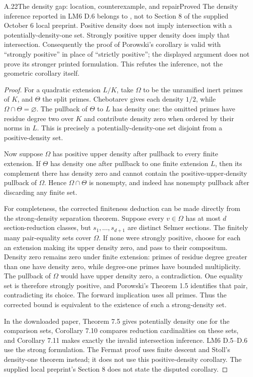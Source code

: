 \begin{statement}{A.22}{The density gap: location, counterexample, and repair}{Proved}
The density inference reported in LM6 D.6 belongs to \citet[Corollary 7.11]{Porowski2026}, not to Section 8 of the supplied October 6 local preprint. Positive density does not imply intersection with a potentially-density-one set. Strongly positive upper density does imply that intersection. Consequently the proof of Porowski's corollary is valid with ``strongly positive'' in place of ``strictly positive''; the displayed argument does not prove its stronger printed formulation. This refutes the inference, not the geometric corollary itself.
\end{statement}
\begin{proof}
For a quadratic extension $L/K$, take $\Omega$ to be the unramified inert primes of $K$, and $\Theta$ the split primes. Chebotarev gives each density $1/2$, while $\Omega\cap\Theta=\varnothing$. The pullback of $\Theta$ to $L$ has density one: the omitted primes have residue degree two over $K$ and contribute density zero when ordered by their norms in $L$. This is precisely a potentially-density-one set disjoint from a positive-density set.

Now suppose $\Omega$ has positive upper density after pullback to every finite extension. If $\Theta$ has density one after pullback to one finite extension $L$, then its complement there has density zero and cannot contain the positive-upper-density pullback of $\Omega$. Hence $\Omega\cap\Theta$ is nonempty, and indeed has nonempty pullback after discarding any finite set.

For completeness, the corrected finiteness deduction can be made directly from the strong-density separation theorem. Suppose every $v\in\Omega$ has at most $d$ section-reduction classes, but $s_1,\dots,s_{d+1}$ are distinct Selmer sections. The finitely many pair-equality sets cover $\Omega$. If none were strongly positive, choose for each an extension making its upper density zero, and pass to their compositum. Density zero remains zero under finite extension: primes of residue degree greater than one have density zero, while degree-one primes have bounded multiplicity. The pullback of $\Omega$ would have upper density zero, a contradiction. One equality set is therefore strongly positive, and Porowski's Theorem 1.5 identifies that pair, contradicting its choice. The forward implication uses all primes. Thus the corrected bound is equivalent to the existence of such a strong-density set.

In the downloaded paper, Theorem 7.5 gives potentially density one for the comparison sets, Corollary 7.10 compares reduction cardinalities on these sets, and Corollary 7.11 makes exactly the invalid intersection inference. LM6 D.5--D.6 use the strong formulation. The Fermat proof uses finite descent and Stoll's density-one theorem instead; it does not use this positive-density corollary. The supplied local preprint's Section 8 does not state the disputed corollary.
\end{proof}

